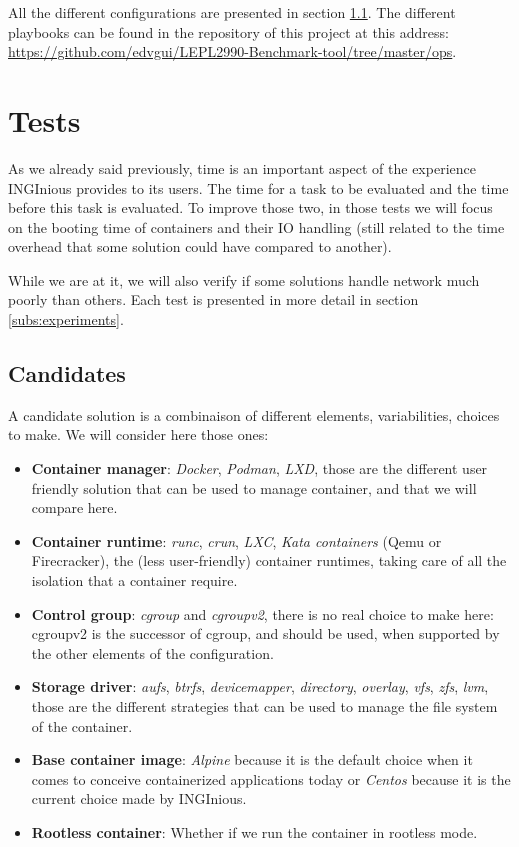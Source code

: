 All the different configurations are presented in section \ref{subs:candidates}.  The different playbooks can be found in the repository of this project at this address: \href{https://github.com/edvgui/LEPL2990-Benchmark-tool/tree/master/ops}{https://github.com/edvgui/LEPL2990-Benchmark-tool/tree/master/ops}. 

\section{Tests}
As we already said previously, time is an important aspect of the experience INGInious provides to its users.  The time for a task to be evaluated and the time before this task is evaluated.  To improve those two, in those tests we will focus on the booting time of containers and their IO handling (still related to the time overhead that some solution could have compared to another).

While we are at it, we will also verify if some solutions handle network much poorly than others.  Each test is presented in more detail in section \ref{subs:experiments}.


\subsection{Candidates}\label{subs:candidates}
A candidate solution is a combinaison of different elements, variabilities, choices to make.  We will consider here those ones:
\begin{itemize}
  \renewcommand\labelitemi{--}
  \item \textbf{Container manager}: \textit{Docker}, \textit{Podman}, \textit{LXD}, those are the different user friendly solution that can be used to manage container, and that we will compare here.
  \item \textbf{Container runtime}: \textit{runc}, \textit{crun}, \textit{LXC}, \textit{Kata containers} (Qemu or Firecracker), the (less user-friendly) container runtimes, taking care of all the isolation that a container require.
  \item \textbf{Control group}: \textit{cgroup} and \textit{cgroupv2}, there is no real choice to make here: cgroupv2 is the successor of cgroup, and should be used, when supported by the other elements of the configuration.
  \item \textbf{Storage driver}: \textit{aufs}, \textit{btrfs}, \textit{devicemapper}, \textit{directory}, \textit{overlay}, \textit{vfs}, \textit{zfs}, \textit{lvm}, those are the different strategies that can be used to manage the file system of the container.
  \item \textbf{Base container image}: \textit{Alpine} because it is the default choice when it comes to conceive containerized applications today or \textit{Centos} because it is the current choice made by INGInious.
  \item \textbf{Rootless container}: Whether if we run the container in rootless mode.
\end{itemize}

